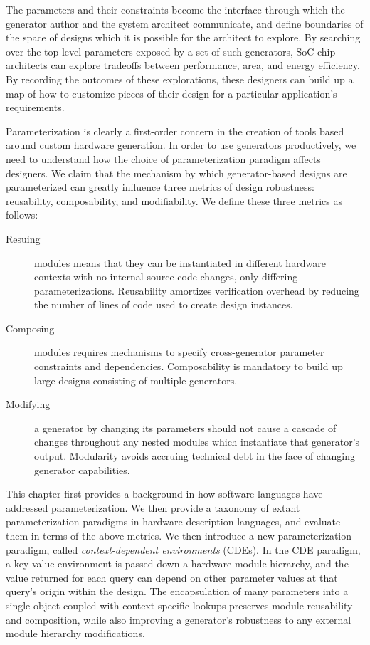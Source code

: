 The parameters and their constraints become the interface through which the generator author and the system architect communicate, and define boundaries of the space of designs which it is possible for the architect to explore.
By searching over the top-level parameters exposed by a set of such generators, SoC chip architects can explore tradeoffs between performance, area, and energy efficiency.
By recording the outcomes of these explorations, these designers can build up a map of how to customize pieces of their design for a particular application's requirements.

Parameterization is clearly a first-order concern in the creation of tools based around custom hardware generation.
In order to use generators productively, we need to understand how the choice of parameterization paradigm affects designers.
We claim that the mechanism by which generator-based designs are parameterized can greatly influence three metrics of design robustness: reusability, composability, and modifiability.
We define these three metrics as follows:
\begin{description}
\item[Resuing] modules means that they can be instantiated in different hardware contexts with no internal source code changes, only differing parameterizations. Reusability amortizes verification overhead by reducing the number of lines of code used to create design instances.
\item[Composing] modules requires mechanisms to specify cross-generator parameter constraints and dependencies. Composability is mandatory to build up large designs consisting of multiple generators.
\item[Modifying] a generator by changing its parameters should not cause a cascade of changes throughout any nested modules which instantiate that generator's output. Modularity avoids accruing technical debt in the face of changing generator capabilities.
\end{description}

This chapter first provides a background in how software languages have addressed parameterization.
We then provide a taxonomy of extant parameterization paradigms in hardware description languages, and evaluate them in terms of the above metrics.
We then introduce a new parameterization paradigm, called \emph{context-dependent environments} (CDEs).
In the CDE paradigm, a key-value environment is passed down a hardware module hierarchy, and the value returned for each query can depend on other parameter values at that query's origin within the design.
The encapsulation of many parameters into a single object coupled with context-specific lookups preserves module reusability and composition, while also improving a generator's robustness to any external module hierarchy modifications.

